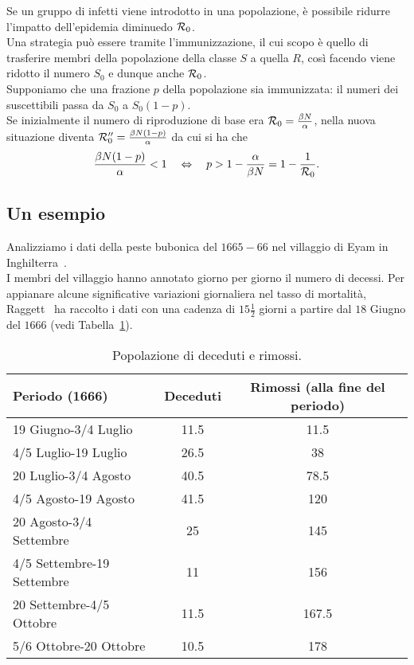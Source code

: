 \begin{oss}[Immunizzazione]
Se un gruppo di infetti viene introdotto in una popolazione,  \`e possibile ridurre l'impatto dell'epidemia diminuedo $\mathcal R_0$.\\
Una strategia pu\`o essere tramite l'immunizzazione, il cui scopo \`e quello di trasferire membri della popolazione della classe $S$ a quella $R$, cos\`i facendo viene ridotto il numero $S_0$ e dunque anche $\mathcal R_0$.\\
Supponiamo che una frazione $p$ della popolazione sia  immunizzata: il numeri dei suscettibili passa da $S_0$ a $S_0(1-p)$.\\
Se inizialmente il numero di riproduzione di base era $\mathcal R_0 = \frac{\beta N}{\alpha}$, nella nuova situazione diventa $\mathcal R_0''=\frac{\beta N(1-p)}{\alpha}$  da cui si ha che  
$$\frac{\beta N(1-p)}{\alpha}< 1\quad \Leftrightarrow \quad p> 1-\frac{\alpha}{\beta N} = 1 -\frac{1}{\mathcal R_0}.
$$

\end{oss}
\newpage
\subsection{Un esempio}
Analizziamo i dati della peste bubonica del $1665-66$ nel villaggio di Eyam in Inghilterra~\cite{raggett1982stochastic}. \\
I membri del villaggio hanno annotato giorno per giorno il numero di decessi. Per appianare alcune significative variazioni giornaliera nel tasso di mortalit\`a,  Raggett~\cite{raggett1982stochastic} ha raccolto  i dati con una cadenza di $15 \frac{1}{2}$ giorni a partire dal $18$ Giugno del $1666$ (vedi Tabella~\ref{table::1}).
\begin{table}[!h]
\centering
\caption{Popolazione di deceduti e rimossi.}
\label{table::1}
\begin{tabular}{l | c | c }

Periodo (1666) & Deceduti & Rimossi (alla fine del periodo) \\
\hline

19 Giugno-3/4 Luglio & 11.5 & 11.5\\
4/5 Luglio-19 Luglio & 26.5 & 38\\ 
20 Luglio-3/4 Agosto & 40.5 & 78.5\\
4/5 Agosto-19 Agosto & 41.5 & 120\\
20 Agosto-3/4 Settembre & 25 & 145\\
4/5 Settembre-19 Settembre & 11 & 156\\
20 Settembre-4/5 Ottobre & 11.5 & 167.5\\
5/6 Ottobre-20 Ottobre & 10.5 & 178\\

\end{tabular}

\end{table}


